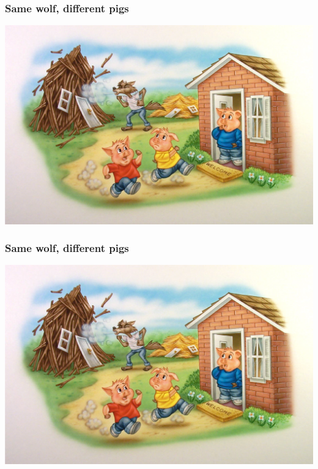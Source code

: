 \documentclass[aspectratio=169]{beamer}
\begin{document}
	\begin{frame}[label=threeLittlePigs]
	    \frametitle{Same wolf, different pigs}
	    \vspace{0.7}
	    \includegraphics[scale=0.47]{pics/ThreeLittlePigs} \\		\hyperlink{simpleQuestion}{}
	\end{frame}

    \begin{frame}[label=threeLittlePigs]
	    \frametitle{Same wolf, different pigs}
	    \vspace{0.7}
	    \includegraphics[scale=0.47]{pics/ThreeLittlePigs} \\		\hyperlink{simpleQuestion}{}
	\end{frame}
\end{document}
